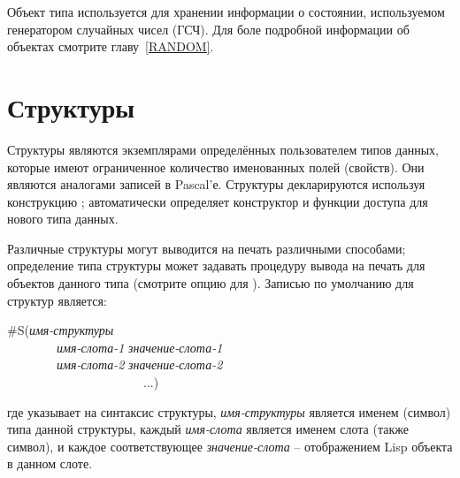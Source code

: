 Объект типа  используется для хранении информации о
состоянии, используемом генератором случайных чисел (ГСЧ). Для боле подробной
информации об объектах  смотрите главу~\ref{RANDOM}.

\section{Структуры}

Структуры являются экземплярами определённых пользователем типов данных, которые
имеют ограниченное количество именованных полей (свойств). Они являются
аналогами записей в Pascal'е.
Структуры декларируются используя конструкцию ;
 автоматически определяет конструктор и функции доступа для нового
типа данных.

Различные структуры могут выводится на печать различными способами;
определение типа структуры может задавать процедуру вывода на печать для
объектов данного типа (смотрите опцию  для ).
Записью по умолчанию для структур является:
\begin{lisp}
\#S(\emph{имя-структуры} \\
~~~~~~~~\emph{имя-слота-1} \emph{значение-слота-1} \\
~~~~~~~~\emph{имя-слота-2} \emph{значение-слота-2} \\
~~~~~~~~~~~~~~~~~~~~~~...)
\end{lisp}
где  указывает на синтаксис структуры, \emph{имя-структуры} является
именем (символ) типа данной структуры, каждый \emph{имя-слота} является именем
слота (также символ), и каждое соответствующее \emph{значение-слота} --
отображением Lisp объекта в данном слоте.

